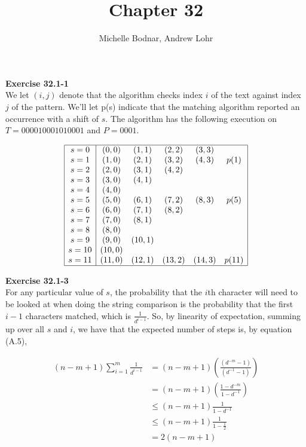 \documentclass{article}
\title{Chapter 32}
\author{Michelle Bodnar, Andrew Lohr}
\begin{document}
\maketitle
\noindent\textbf{Exercise 32.1-1}\\

We let $(i,j)$ denote that the algorithm checks index $i$ of the text against index $j$ of the pattern. We'll let p(s) indicate that the matching algorithm reported an occurrence with a shift of $s$. The algorithm has the following execution on $T = 000010001010001$ and $P = 0001$.

\[
\begin{array}{|c|ccccc|}
\hline
s=0&(0,0)&(1,1)&(2,2)&(3,3)&\\
s=1&(1,0)&(2,1)&(3,2)&(4,3)&p(1)\\
s=2&(2,0)&(3,1)&(4,2)&&\\
s=3&(3,0)&(4,1)&&&\\
s=4&(4,0)&&&&\\
s=5&(5,0)&(6,1)&(7,2)&(8,3)&p(5)\\
s=6&(6,0)&(7,1)&(8,2)&&\\
s=7&(7,0)&(8,1)&&&\\
s=8&(8,0)&&&&\\
s=9&(9,0)&(10,1)&&&\\
s=10&(10,0)&&&&\\
s=11&(11,0)&(12,1)&(13,2)&(14,3)&p(11)\\
\hline
\end{array}
\]



\noindent\textbf{Exercise 32.1-3}\\

For any particular value of $s$, the probability that the $i$th character will need to be looked at when doing the string comparison is the probability that the first $i-1$ characters matched, which is $\frac{1}{d^{i-1}}$. So, by linearity of expectation, summing up over all $s$ and $i$, we have that the expected number of steps is, by equation (A.5),

\begin{align*}
(n-m+1) \sum_{i=1}^{m} \frac{1}{d^{i-1}}&=  (n-m+1)\left(\frac{(d^{-m}-1)}{(d^{-1}-1)}\right)\\
&= (n-m+1)(\frac{1-d^{-m}}{1-d^{-1}}) \\
&\le (n-m+1) \frac{1}{1-d^{-1}}\\
&\le (n-m+1) \frac{1}{1-\frac{1}{2}}\\
& = 2(n-m+1)
\end{align*}
\end{document}
